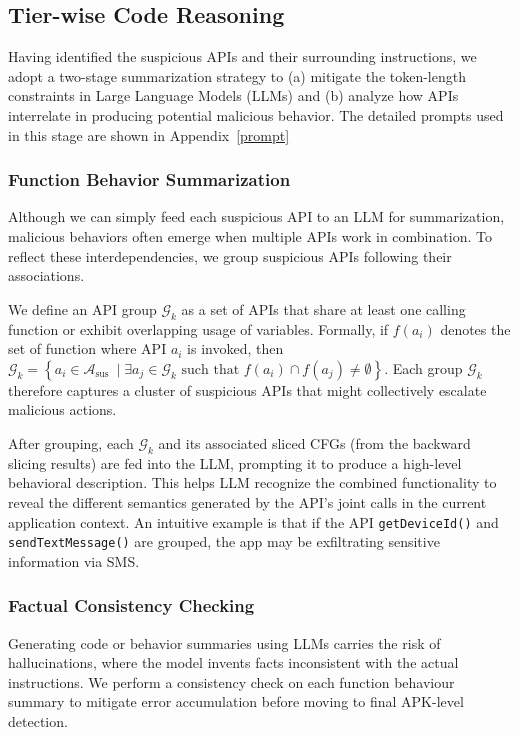 \subsection{Tier-wise Code Reasoning}
Having identified the suspicious APIs and their surrounding instructions, we adopt a two-stage summarization strategy to (a) mitigate the token-length constraints in Large Language Models (LLMs) and (b) analyze how APIs interrelate in producing potential malicious behavior. The detailed prompts used in this stage are shown in Appendix~\ref{prompt}

\subsubsection{Function Behavior Summarization}
Although we can simply feed each suspicious API to an LLM for summarization, malicious behaviors often emerge when multiple APIs work in combination. To reflect these interdependencies, we group suspicious APIs following their associations.

We define an API group $\mathcal{G}_k$ as a set of APIs that share at least one calling function or exhibit overlapping usage of variables. Formally, if $f(a_i)$ denotes the set of function where API $a_i$ is invoked, then $\mathcal{G}_k=\left\{a_i \in \mathcal{A}_{\text {sus }} \mid \exists a_j \in \mathcal{G}_k \text { such that } f\left(a_i\right) \cap f\left(a_j\right) \neq \emptyset\right\}$. Each group $\mathcal{G}_k$ therefore captures a cluster of suspicious APIs that might collectively escalate malicious actions. 

After grouping, each $\mathcal{G}_k$ and its associated sliced CFGs (from the backward slicing results) are fed into the LLM, prompting it to produce a high-level behavioral description. This helps LLM recognize the combined functionality to reveal the different semantics generated by the API's joint calls in the current application context. An intuitive example is that if the API \verb|getDeviceId()| and \verb|sendTextMessage()| are grouped, the app may be exfiltrating sensitive information via SMS. 

\subsubsection{Factual Consistency Checking}
Generating code or behavior summaries using LLMs carries the risk of hallucinations, where the model invents facts inconsistent with the actual instructions. We perform a consistency check on each function behaviour summary to mitigate error accumulation before moving to final APK-level detection.

